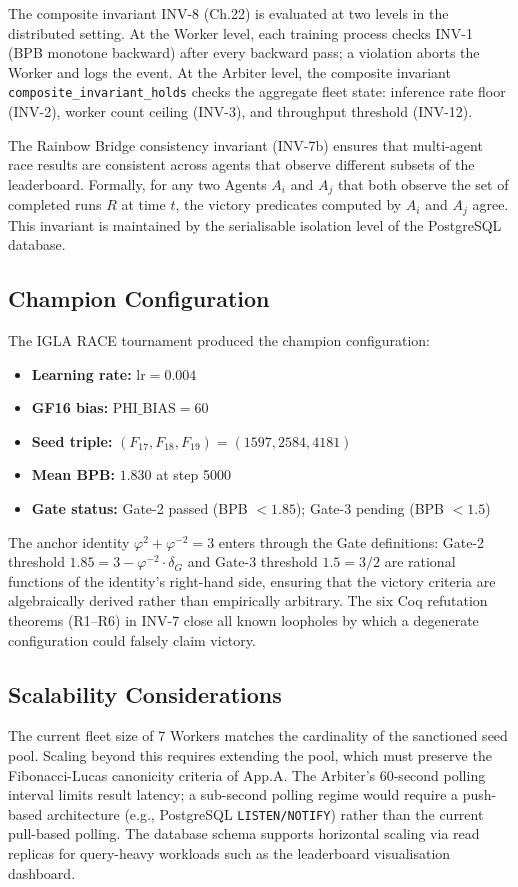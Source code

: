 The composite invariant INV-8 (Ch.22) is evaluated at two levels in the distributed setting. At the Worker level, each training process checks INV-1 (BPB monotone backward) after every backward pass; a violation aborts the Worker and logs the event. At the Arbiter level, the composite invariant \texttt{composite\_invariant\_holds} checks the aggregate fleet state: inference rate floor (INV-2), worker count ceiling (INV-3), and throughput threshold (INV-12).

The Rainbow Bridge consistency invariant (INV-7b) ensures that multi-agent race results are consistent across agents that observe different subsets of the leaderboard. Formally, for any two Agents \(A_i\) and \(A_j\) that both observe the set of completed runs \(R\) at time \(t\), the victory predicates computed by \(A_i\) and \(A_j\) agree. This invariant is maintained by the serialisable isolation level of the PostgreSQL database.

\subsection{Champion Configuration}\label{fa_21:subsec:champion-config}

The IGLA RACE tournament produced the champion configuration:
\begin{itemize}
\item \textbf{Learning rate:} \(\text{lr} = 0.004\)
\item \textbf{GF16 bias:} \(\text{PHI\_BIAS} = 60\)
\item \textbf{Seed triple:} \((F_{17}, F_{18}, F_{19}) = (1597, 2584, 4181)\)
\item \textbf{Mean BPB:} \(1.830\) at step 5000
\item \textbf{Gate status:} Gate-2 passed (BPB \(< 1.85\)); Gate-3 pending (BPB \(< 1.5\))
\end{itemize}

The anchor identity \(\varphi^2 + \varphi^{-2} = 3\) enters through the Gate definitions: Gate-2 threshold \(1.85 = 3 - \varphi^{-2} \cdot \delta_G\) and Gate-3 threshold \(1.5 = 3/2\) are rational functions of the identity's right-hand side, ensuring that the victory criteria are algebraically derived rather than empirically arbitrary. The six Coq refutation theorems (R1--R6) in INV-7 close all known loopholes by which a degenerate configuration could falsely claim victory.

\subsection{Scalability Considerations}\label{fa_21:subsec:scalability}

The current fleet size of 7 Workers matches the cardinality of the sanctioned seed pool. Scaling beyond this requires extending the pool, which must preserve the Fibonacci-Lucas canonicity criteria of App.A. The Arbiter's 60-second polling interval limits result latency; a sub-second polling regime would require a push-based architecture (e.g., PostgreSQL \texttt{LISTEN/NOTIFY}) rather than the current pull-based polling. The database schema supports horizontal scaling via read replicas for query-heavy workloads such as the leaderboard visualisation dashboard.


